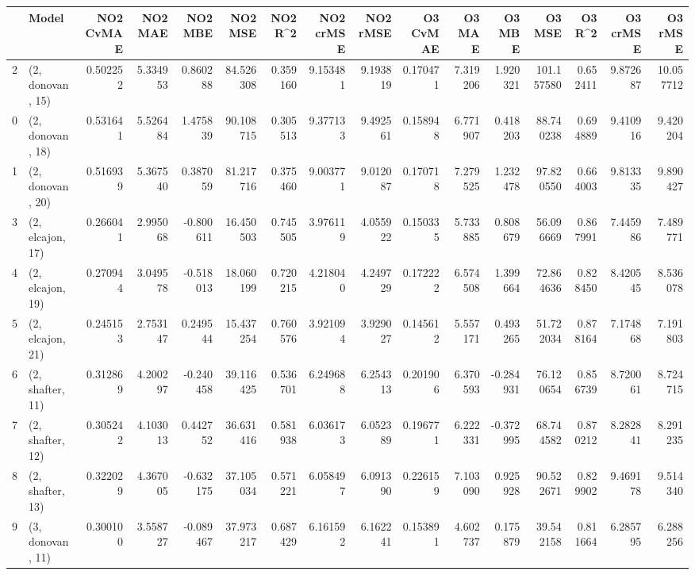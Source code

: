 \begin{tabular}{llrrrrrrrrrrrrrr}
\toprule
{} &             Model &  NO2 CvMAE &   NO2 MAE &   NO2 MBE &    NO2 MSE &   NO2 R\textasciicircum2 &  NO2 crMSE &  NO2 rMSE &  O3 CvMAE &    O3 MAE &    O3 MBE &      O3 MSE &    O3 R\textasciicircum2 &   O3 crMSE &    O3 rMSE \\
\midrule
2  &  (2, donovan, 15) &   0.502252 &  5.334953 &  0.860288 &  84.526308 &  0.359160 &   9.153481 &  9.193819 &  0.170471 &  7.319206 &  1.920321 &  101.157580 &  0.652411 &   9.872687 &  10.057712 \\
0  &  (2, donovan, 18) &   0.531641 &  5.526484 &  1.475839 &  90.108715 &  0.305513 &   9.377133 &  9.492561 &  0.158948 &  6.771907 &  0.418203 &   88.740238 &  0.694889 &   9.410916 &   9.420204 \\
1  &  (2, donovan, 20) &   0.516939 &  5.367540 &  0.387059 &  81.217716 &  0.375460 &   9.003771 &  9.012087 &  0.170718 &  7.279525 &  1.232478 &   97.820550 &  0.664003 &   9.813335 &   9.890427 \\
3  &  (2, elcajon, 17) &   0.266041 &  2.995068 & -0.800611 &  16.450503 &  0.745505 &   3.976119 &  4.055922 &  0.150335 &  5.733885 &  0.808679 &   56.096669 &  0.867991 &   7.445986 &   7.489771 \\
4  &  (2, elcajon, 19) &   0.270944 &  3.049578 & -0.518013 &  18.060199 &  0.720215 &   4.218040 &  4.249729 &  0.172222 &  6.574508 &  1.399664 &   72.864636 &  0.828450 &   8.420545 &   8.536078 \\
5  &  (2, elcajon, 21) &   0.245153 &  2.753147 &  0.249544 &  15.437254 &  0.760576 &   3.921094 &  3.929027 &  0.145612 &  5.557171 &  0.493265 &   51.722034 &  0.878164 &   7.174868 &   7.191803 \\
6  &  (2, shafter, 11) &   0.312869 &  4.200297 & -0.240458 &  39.116425 &  0.536701 &   6.249688 &  6.254313 &  0.201906 &  6.370593 & -0.284931 &   76.120654 &  0.856739 &   8.720061 &   8.724715 \\
7  &  (2, shafter, 12) &   0.305242 &  4.103013 &  0.442752 &  36.631416 &  0.581938 &   6.036173 &  6.052389 &  0.196771 &  6.222331 & -0.372995 &   68.744582 &  0.870212 &   8.282841 &   8.291235 \\
8  &  (2, shafter, 13) &   0.322029 &  4.367005 & -0.632175 &  37.105034 &  0.571221 &   6.058497 &  6.091390 &  0.226159 &  7.103090 &  0.925928 &   90.522671 &  0.829902 &   9.469178 &   9.514340 \\
9  &  (3, donovan, 11) &   0.300100 &  3.558727 & -0.089467 &  37.973217 &  0.687429 &   6.161592 &  6.162241 &  0.153891 &  4.602737 &  0.175879 &   39.542158 &  0.811664 &   6.285795 &   6.288256 \\

\end{tabular}
